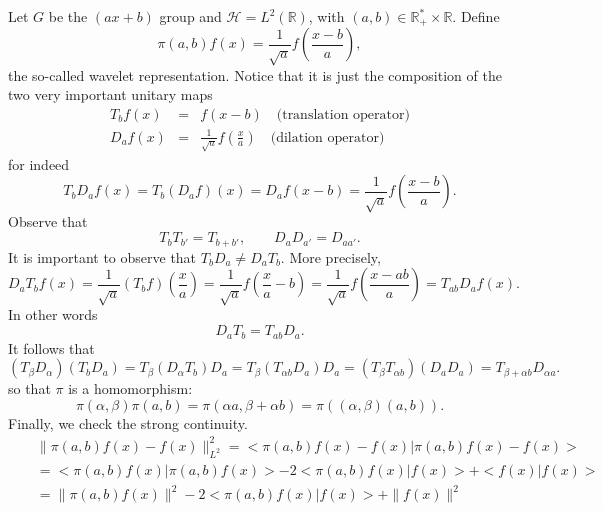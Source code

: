 \documentclass[a4paper,11pt]{article} %
\newcommand{\norm}[1]{\|{#1}\|} %
\numberwithin{equation}{section} %
\numberwithin{figure}{section} %
\begin{document}
Let $G$ be the $(ax+b)$ group and $\mathcal{H}=L^2(\mathbb{R})$, with $(a,b) \in \mathbb{R}^{\ast}_{+} \times \mathbb{R}$. Define
\begin{equation}
\pi(a,b)f(x)=\frac{1}{\sqrt a}f\left(\frac{x-b}{a}\right),
\end{equation}
the so-called wavelet representation. Notice that it is just the composition of the two very important unitary maps
\begin{eqnarray}
T_bf(x)&=& f(x-b)\quad \text{(translation operator)}  \\
D_af(x)&=& \frac{1}{\sqrt a}f\left(\frac{x}{a}\right) \quad \text{(dilation operator)}    
\end{eqnarray}
for indeed
\begin{equation}
T_bD_af(x)=T_b(D_af)(x)=D_af(x-b)=\frac{1}{\sqrt a}f\left(\frac{x-b}{a}\right). 
\end{equation}
Observe that
\begin{equation}
 T_bT_{b'}=T_{b+b'}, \qquad D_aD_{a'}=D_{aa'}.
\end{equation}
It is important to observe that $T_bD_a\not=D_aT_b$. More precisely, 
\begin{equation}
 D_aT_bf(x)=\frac{1}{\sqrt a}(T_bf)\left(\frac{x}{a}\right)
=\frac{1}{\sqrt a}f\left(\frac{x}{a}-b\right)
=\frac{1}{\sqrt a}f\left(\frac{x-ab}{a}\right)=T_{ab}D_af(x).
\end{equation}
In other words 
\begin{equation}
D_aT_b=T_{ab}D_a. 
\end{equation}
It follows that
\begin{equation}
(T_\beta D_\alpha)(T_bD_a)=T_\beta(D_\alpha T_b)D_a
=T_\beta(T_{\alpha b}D_a)D_a
=(T_\beta T_{\alpha b})(D_aD_a)
=T_{\beta+\alpha b}D_{\alpha a}. 
\end{equation}
so that $\pi$ is a homomorphism:
\begin{equation}
\pi(\alpha,\beta)\pi(a,b)=\pi(\alpha a,\beta+\alpha b)=\pi((\alpha,\beta)(a,b)). 
\end{equation}
Finally, we check the strong continuity.
\begin{eqnarray*}
&& \norm{\pi(a,b) f(x) - f(x)}_{L^2}^2 = < \pi(a,b) f(x) - f(x) | \pi(a,b) f(x) - f(x) > \\
&& = < \pi(a,b) f(x) | \pi(a,b) f(x) > - 2 < \pi(a,b) f(x) | f(x) > + < f(x) | f(x) >  \\
&& = \norm{\pi(a,b) f(x)}^2 - 2 < \pi(a,b) f(x) | f(x) > + \norm{f(x)}^2 
\end{eqnarray*}
\end{document}
